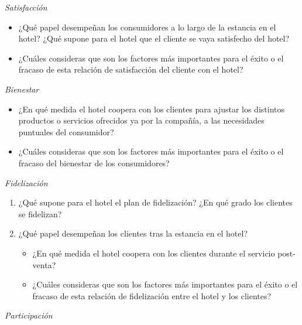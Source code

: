 \emph{Satisfacción}

\begin{itemize}
			\item ¿Qué papel desempeñan los consumidores a lo largo de la estancia en el hotel? ¿Qué supone para el hotel que el cliente se vaya satisfecho del hotel?
			\item ¿Cuáles consideras que son los factores más importantes para el éxito o el fracaso de esta relación de satisfacción del cliente con el hotel?

\end{itemize}

\emph{Bienestar}

\begin{itemize}
			\item ¿En qué medida el hotel coopera con los clientes para ajustar los distintos productos o servicios ofrecidos ya por la compañía, a las necesidades puntuales del consumidor?
			\item ¿Cuáles consideras que son los factores más importantes para el éxito o el fracaso del bienestar de los consumidores?

\end{itemize}


\emph{Fidelización}

\begin{enumerate}
	\item ¿Qué supone para el hotel el plan de fidelización? ¿En qué grado los clientes se fidelizan?
	\item ¿Qué papel desempeñan los clientes tras la estancia en el hotel?

\begin{itemize}
			\item ¿En qué medida el hotel coopera con los clientes durante el servicio post-venta?
			\item ¿Cuáles consideras que son los factores más importantes para el éxito o el fracaso de esta relación de fidelización entre el hotel y los clientes?
\end{itemize}

\end{enumerate}

\emph{Participación}

